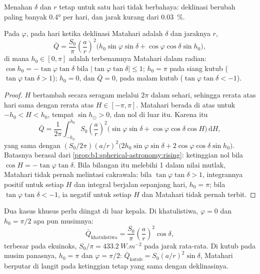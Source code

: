 Menahan $\delta$ dan $r$ tetap untuk satu hari tidak berbahaya: deklinasi berubah paling banyak \ang{0.4} per hari, dan jarak kurang dari \qty{0.03}{\percent}.

\begin{theorem}\label{thm:b1:radiation-heat-transport:daily}
Pada  $\varphi$, pada hari ketika deklinasi Matahari adalah $\delta$ dan jaraknya $r$,
\[
  \bar Q = \frac{S_0}{\pi}\left(\frac{a}{r}\right)^{2}
  \bigl(h_0\sin\varphi\sin\delta + \cos\varphi\cos\delta\sin h_0\bigr),
\]
di mana $h_0 \in [0, \pi]$ adalah  terbenamnya Matahari dalam radian: $\cos h_0 =
-\tan\varphi\tan\delta$ bila $|\tan\varphi\tan\delta| \le 1$; $h_0 = \pi$ pada siang kutub ($\tan\varphi\tan\delta > 1$); $h_0 = 0$, dan $\bar Q = 0$, pada malam kutub ($\tan\varphi\tan\delta < -1$).
\end{theorem}

\begin{proof}
 $H$ bertambah secara seragam melalui $2\pi$ dalam sehari, sehingga rerata atas hari sama dengan rerata atas $H \in [-\pi, \pi]$. Matahari berada di atas untuk $-h_0 < H < h_0$, tempat $\sin h_\odot > 0$, dan  nol di luar itu. Karena itu
\[
  \bar Q = \frac{1}{2\pi}\int_{-h_0}^{h_0} S_0\left(\frac{a}{r}\right)^{2}
  \bigl(\sin\varphi\sin\delta + \cos\varphi\cos\delta\cos H\bigr)\,\mathrm dH ,
\]
yang sama dengan $(S_0/2\pi)(a/r)^2\bigl(2h_0\sin\varphi\sin\delta +
2\cos\varphi\cos\delta\sin h_0\bigr)$. Batasnya berasal dari \cref{prop:b1:spherical-astronomy:rising}: ketinggian nol bila $\cos H = -\tan\varphi\tan\delta$. Bila bilangan itu melebihi 1 dalam nilai mutlak, Matahari tidak pernah melintasi cakrawala: bila $\tan\varphi\tan\delta > 1$, integrannya positif untuk setiap $H$ dan integral berjalan sepanjang hari, $h_0 = \pi$; bila $\tan\varphi\tan\delta < -1$, ia negatif untuk setiap $H$ dan Matahari tidak pernah terbit.
\end{proof}

Dua kasus khusus perlu diingat di luar kepala. Di khatulistiwa, $\varphi = 0$ dan $h_0 = \pi/2$ apa pun musimnya:
\[
  \bar Q_\text{khatulistiwa} = \frac{S_0}{\pi}\left(\frac{a}{r}\right)^{2}\cos\delta ,
\]
terbesar pada ekuinoks, $S_0/\pi = \qty{433.2}{W.m^{-2}}$ pada jarak rata-rata.
Di kutub pada musim panasnya, $h_0 = \pi$ dan $\varphi = \pi/2$: $\bar Q_\text{kutub} =
S_0(a/r)^2\sin\delta$, Matahari berputar di langit pada ketinggian tetap yang sama dengan deklinasinya.

